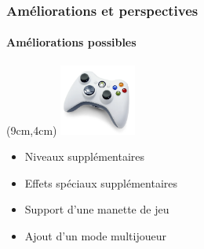 \begin{frame}

\frametitle{Améliorations et perspectives}
	\framesubtitle{Améliorations possibles}


	\begin{textblock*}{2.5cm}(9cm,4cm)
		\includegraphics[width=2.5cm]{figures/pad_xbox.png}
	\end{textblock*}


	\begin{itemize}
		\item Niveaux supplémentaires
	\end{itemize}

	\begin{itemize}
		\item Effets spéciaux supplémentaires
	\end{itemize}
	
	\begin{itemize}
		\item Support d'une manette de jeu
	\end{itemize}

	\begin{itemize}
		\item Ajout d'un mode multijoueur
	\end{itemize}
	

\end{frame}
